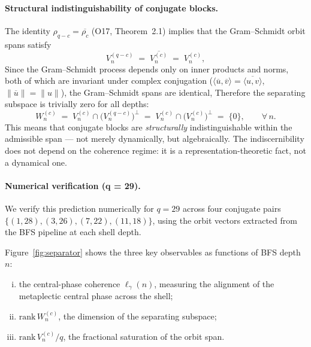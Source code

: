     \paragraph{Structural indistinguishability of conjugate blocks.}

      The identity $\rho_{q-c} = \overline{\rho_c}$ (O17, Theorem~2.1) implies that
      the Gram--Schmidt orbit spans satisfy
    \begin{equation}
      V_n^{(q-c)} \;=\; \overline{V_n^{(c)}} \;=\; V_n^{(c)},
      \end{equation}
      Since the Gram--Schmidt process depends only on inner products and norms,
      both of which are invariant under complex conjugation
      ($\langle \overline{u}, \overline{v} \rangle = \overline{\langle u,v\rangle}$,
      $\|\overline{u}\| = \|u\|$), the Gram--Schmidt spans are identical,
      Therefore the separating subspace is trivially zero for all depths:
    \begin{equation}
      W_n^{(c)}
      \;=\; V_n^{(c)} \cap \bigl(V_n^{(q-c)}\bigr)^\perp
      \;=\; V_n^{(c)} \cap \bigl(V_n^{(c)}\bigr)^\perp
      \;=\; \{0\},
      \qquad \forall\, n.
      \end{equation}
      This means that conjugate blocks are \emph{structurally} indistinguishable
      within the admissible span — not merely dynamically, but algebraically.
      The indiscernibility does not depend on the coherence regime: it is a
      representation-theoretic fact, not a dynamical one.

    \paragraph{Numerical verification (q = 29).}

      We verify this prediction numerically for $q = 29$ across four conjugate
      pairs $\{(1,28), (3,26), (7,22), (11,18)\}$, using the orbit vectors
      extracted from the BFS pipeline at each shell depth.

      Figure~\ref{fig:separator} shows the three key observables as functions of
      BFS depth~$n$:
    \begin{enumerate}[(i)]
\item the central-phase coherence $\ell_\gamma(n)$,
measuring the alignment of the metaplectic central phase across the shell;
\item $\mathrm{rank}\,W_n^{(c)}$, the dimension of the separating subspace;
\item $\mathrm{rank}\,V_n^{(c)}/q$, the fractional saturation of the orbit span.
      \end{enumerate}

